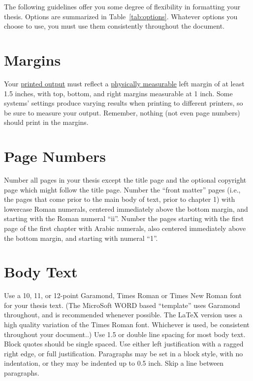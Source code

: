 \iffalse
The following guidelines offer you some degree of flexibility in formatting
your thesis. Options are summarized in Table~\ref{tab:options}.  Whatever
options you choose to use, you must use them consistently throughout the document.

\section{Margins}

Your \underline{printed output} must reflect a \underline{physically
measurable} left margin of at least 1.5 inches, with top, bottom, and right
margins measurable at 1 inch.  Some systems' settings produce varying results
when printing to different printers, so be sure to measure your output.
Remember, nothing (not even page numbers) should print in the margins.

\section{Page Numbers}

Number all pages in your thesis except the title page and the optional
copyright page which might follow the title page.  Number the ``front matter''
pages (i.e., the pages that come prior to the main body of text, prior to
chapter 1) with lowercase Roman numerals, centered immediately above the bottom
margin, and starting with the Roman numeral ``ii''.  Number the pages starting
with the first page of the first chapter with Arabic numerals, also centered
immediately above the bottom margin, and starting with numeral ``1''.

\section{Body Text}

Use a 10, 11, or 12-point Garamond, Times Roman or Times New Roman font for
your thesis text.   (The MicroSoft WORD based ``template'' uses
Garamond throughout, and is recommended whenever possible.  The \LaTeX{}
version uses a high quality variation of the Times Roman font.  Whichever is
used, be consistent throughout your document..)  Use 1.5 or double line
spacing for most body text.  Block quotes should be single spaced.  Use either
left justification with a ragged right edge, or full justification.  Paragraphs
may be set in a block style, with no indentation, or they may be indented up to
0.5 inch.  Skip a line between paragraphs.

